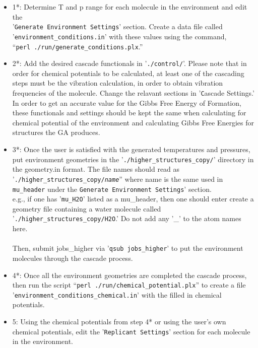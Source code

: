 \begin{itemize}

\item 1*: Determine T and p range for each molecule in the environment and edit the \\'\texttt{Generate Environment Settings}' section. Create a data file called\\ '\texttt{environment\_conditions.in}' with these values using the command,\\ ``\texttt{perl ./run/generate\_conditions.plx}.''

\item 2*: Add the desired cascade functionals in '\texttt{./control/}'. Please note that in order for chemical potentials to be calculated, at least one of the cascading steps must be the vibration calculation, in order to obtain vibration frequencies of the molecule. Change the relavant sections in '{\texttt Cascade Settings}.' In order to get an accurate value for the Gibbs Free Energy of Formation, these functionals and settings should be kept the same when calculating for chemical potential of the environment and calculating Gibbs Free Energies for structures the GA produces.

\item 3*: Once the user is satisfied with the generated temperatures and pressures, put environment geometries in the '\texttt{./higher\_structures\_copy/}' directory in the geometry.in format. The file names should read as '\texttt{./higher\_structures\_copy/{\em {name}}}'' where name is the same used in \texttt{mu\_header} under the \texttt{Generate Environment Settings}' section.\\
e.g., if one has '\texttt{mu\_H2O}' listed as a mu\_header, then one should enter create a geometry file containing a water molecule called '\texttt{./higher\_structures\_copy/H2O}.' Do not add any '\_' to the atom names here.\\ \\ Then, submit jobs\_higher via '\texttt{qsub jobs\_higher}' to put the environment molecules through the cascade process. 

\item 4*: Once all the environment geometries are completed the cascade process, then run the script ``\texttt{perl ./run/chemical\_potential.plx}'' to create a file '\texttt{environment\_conditions\_chemical.in}' with the filled in chemical potentials.

\item 5: Using the chemical potentials from step 4* or using the user's own chemical potentials, edit the '\texttt{Replicant Settings}' section for each molecule in the environment.


\end{itemize}
